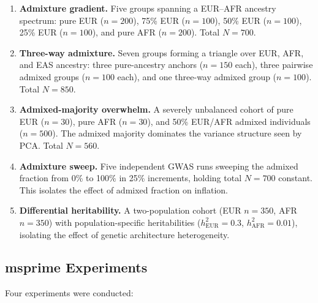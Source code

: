 \documentclass[unnumsec,webpdf,contemporary,large]{oup-authoring-template}
\theoremstyle{thmstyleone}
\theoremstyle{thmstyletwo}
\theoremstyle{thmstylethree}
\begin{document}
\begin{enumerate}
\item \textbf{Admixture gradient.} Five groups spanning a EUR--AFR ancestry spectrum: pure EUR ($n=200$), 75\% EUR ($n=100$), 50\% EUR ($n=100$), 25\% EUR ($n=100$), and pure AFR ($n=200$). Total $N=700$.

\item \textbf{Three-way admixture.} Seven groups forming a triangle over EUR, AFR, and EAS ancestry: three pure-ancestry anchors ($n=150$ each), three pairwise admixed groups ($n=100$ each), and one three-way admixed group ($n=100$). Total $N=850$.

\item \textbf{Admixed-majority overwhelm.} A severely unbalanced cohort of pure EUR ($n=30$), pure AFR ($n=30$), and 50\% EUR/AFR admixed individuals ($n=500$). The admixed majority dominates the variance structure seen by PCA. Total $N=560$.

\item \textbf{Admixture sweep.} Five independent GWAS runs sweeping the admixed fraction from 0\% to 100\% in 25\% increments, holding total $N=700$ constant. This isolates the effect of admixed fraction on inflation.

\item \textbf{Differential heritability.} A two-population cohort (EUR $n=350$, AFR $n=350$) with population-specific heritabilities ($h^2_{\text{EUR}}=0.3$, $h^2_{\text{AFR}}=0.01$), isolating the effect of genetic architecture heterogeneity.
\end{enumerate}

\subsection{msprime Experiments}
Four experiments were conducted:
\end{document}
